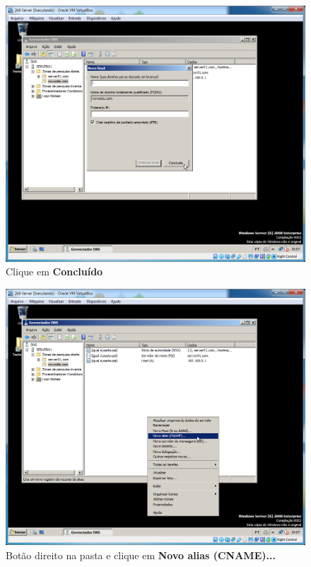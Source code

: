 \documentclass[10pt]{article}
\begin{document}
\begin{figure}[H]
    \centering
    \caption{Clique em \textbf{Concluído}}
    \label{fig:5532013}
    \includegraphics[width=\linewidth]{images/IIS/criando_um_novo_site/013.png}
\end{figure}
\begin{figure}[H]
    \centering
    \caption{Botão direito na pasta e clique em \textbf{Novo alias (CNAME)...}}
    \label{fig:5532014}
    \includegraphics[width=\linewidth]{images/IIS/criando_um_novo_site/014.png}
\end{figure}
\end{document}
